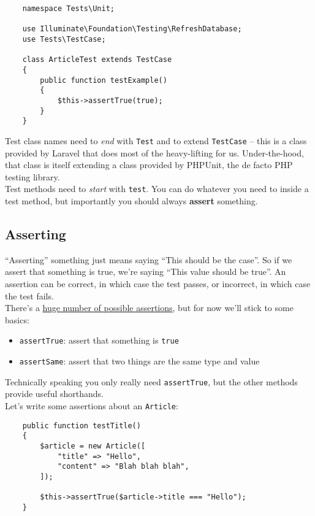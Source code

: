 \begin{verbatim}
    namespace Tests\Unit;

    use Illuminate\Foundation\Testing\RefreshDatabase;
    use Tests\TestCase;

    class ArticleTest extends TestCase
    {
        public function testExample()
        {
            $this->assertTrue(true);
        }
    }
\end{verbatim}

Test class names need to \textit{end} with \texttt{Test} and to extend \texttt{TestCase} – this is a class provided by Laravel that does most of the heavy-lifting for us. Under-the-hood, that class is itself extending a class provided by PHPUnit, the de facto PHP testing library.
\\

Test methods need to \textit{start} with \texttt{test}. You can do whatever you need to inside a test method, but importantly you should always \textbf{assert} something.

\subsection{Asserting}

``Asserting'' something just means saying ``This should be the case''. So if we assert that something is true, we're saying ``This value should be true''. An assertion can be correct, in which case the test passes, or incorrect, in which case the test fails.
\\

There's a \href{https://phpunit.readthedocs.io/en/9.0/assertions.html}{huge number of possible assertions}, but for now we'll stick to some basics:

\begin{itemize}
    \item \texttt{assertTrue}: assert that something is \texttt{true}
    \item \texttt{assertSame}: assert that two things are the same type and value
\end{itemize}

Technically speaking you only really need \texttt{assertTrue}, but the other methods provide useful shorthands.
\\

Let's write some assertions about an \texttt{Article}:

\begin{verbatim}
    public function testTitle()
    {
        $article = new Article([
            "title" => "Hello",
            "content" => "Blah blah blah",
        ]);

        $this->assertTrue($article->title === "Hello");
    }
\end{verbatim}

